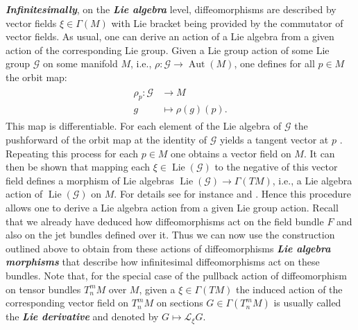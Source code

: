 \textit{\textbf{Infinitesimally}}, on the \textbf{\textit{Lie algebra}} level, diffeomorphisms are described by vector fields $\xi \in \Gamma(M)$ with Lie bracket being provided by the commutator of vector fields. 
As usual, one can derive an action of a Lie algebra from a given action of the corresponding Lie group.
Given a Lie group action of some Lie group $\mathcal{G}$ on some manifold $M$, i.e., $\rho : \mathcal{G} \rightarrow \operatorname{Aut}(M)$, one defines for all $p \in M$ the orbit map:
\begin{align}
    \begin{aligned}
    \rho_p : \mathcal{G} &\longrightarrow M \\
    g &\longmapsto \rho(g)(p).
    \end{aligned}
\end{align}
This map is differentiable. For each element of the Lie algebra of $\mathcal{G}$ the pushforward of the orbit map at the identity of $\mathcal{G}$ yields a tangent vector at $p$ . Repeating this process for each $p \in M$ one obtains a vector field on $M$. It can then be shown that mapping each $\xi \in \operatorname{Lie}(\mathcal{G})$ to the negative of this vector field defines a morphism of Lie algebras $\operatorname{Lie}(\mathcal{G}) \rightarrow \Gamma(TM)$, i.e., a Lie algebra action of $\operatorname{Lie}(\mathcal{G})$ on $M$. For details see for instance \cite{libermann2012symplectic} and \cite{doi:10.1142/3867}.
Hence this procedure allows one to derive a Lie algebra action from a given Lie group action. Recall that we already have deduced how diffeomorphisms act on the field bundle $F$ and also on the jet bundles defined over it. Thus we can now use the construction outlined above to obtain from these actions of diffeomorphisms \textit{\textbf{Lie algebra morphisms}} that describe how infinitesimal diffeomorphisms act on these bundles.
Note that, for the special case of the pullback action of diffeomorphism on tensor bundles $T^m_nM$ over $M$, given a $\xi \in \Gamma(TM)$ the induced action of the corresponding vector field on $T^m_nM$ on sections $G \in \Gamma(T^m_nM)$ is usually called the \textit{\textbf{Lie derivative}} and denoted by $G \mapsto \mathcal{L}_{\xi}G$. 

